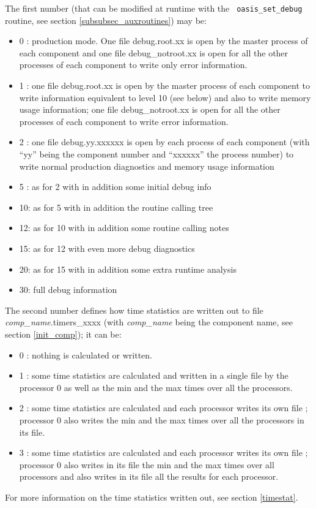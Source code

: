 \begin{itemize}
  The first number (that can be modified at runtime with the {\tt
    oasis\_set\_debug} routine, see section
  \ref{subsubsec_auxroutines}) may be:
  \begin{itemize}
  \item 0 : production mode. One file debug.root.xx is open by the master process of
    each component and one file debug\_notroot.xx is open for all the
    other processes of each component to write only error information.
  \item 1 : one file debug.root.xx is open by the master process of
    each component to write information equivalent to level 10 (see
    below) and also to write memory usage information; 
    one file debug\_notroot.xx is open for all the other
    processes of each component to write error information.
  \item 2 : one file debug.yy.xxxxxx is open by each process of each
    component (with ``yy” being the component number and ``xxxxxx” the process number) 
    to write normal production diagnostics and memory usage information
  \item 5 : as for 2 with in addition some initial debug info
  \item 10: as for 5 with in addition the routine calling tree
  \item 12: as for 10 with in addition some routine calling notes
  \item 15: as for 12 with even more debug diagnostics
  \item 20: as for 15 with in addition some extra runtime analysis
  \item 30: full debug information
  \end{itemize}
  The second number defines how time statistics are written out to
  file {\it comp\_name}.timers\_xxxx (with {\it comp\_name} being the component name, see section \ref{init_comp}); it can be:
  \begin{itemize}
  \item 0 : nothing is calculated or written.
  \item 1 : some time statistics are calculated and written in a
    single file by the processor 0 as well as the min and the max
    times over all the processors.
  \item 2 : some time statistics are calculated and each processor
    writes its own file ; processor 0 also writes the min and the max
    times over all the processors in its file.
  \item 3 : some time statistics are calculated and each processor
    writes its own file ; processor 0 also writes in its file the min
    and the max times over all processors and also writes in its file
    all the results for each processor.
  \end{itemize}
 For more information on the time statistics written out, see section
  \ref{timestat}.


\end{itemize}

